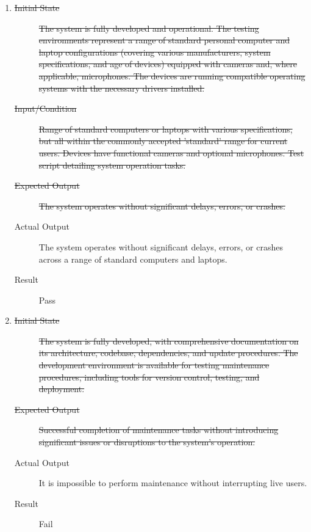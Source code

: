 \documentclass[12pt, titlepage]{article}
\begin{document}
\begin{enumerate}[NFR-T1]
  \item \label{NFRT18}
    \begin{description}
    \item[\sout{Initial State}]\sout{ The system is fully developed and operational. The testing
      environments represent a range of standard personal computer and laptop
      configurations (covering various manufacturers, system specifications, and
      age of devices) equipped with cameras and, where applicable, microphones.
      The devices are running compatible operating systems with the necessary
      drivers installed.
    }\item[\sout{Input/Condition}]\sout{ Range of standard computers or laptops with various
      specifications, but all within the commonly accepted 'standard' range for
      current users. Devices have functional cameras and optional microphones.
      Test script detailing system operation tasks.
    }\item[\sout{Expected Output}]\sout{ The system operates without significant delays, errors,
      or crashes.
    }\item[Actual Output] The system operates without significant delays, errors, or
      crashes across a range of standard computers and laptops.
    \item[Result] Pass
    \end{description}
  \item \label{NFRT19}
    \begin{description}
    \item[\sout{Initial State}]\sout{ The system is fully developed, with comprehensive
      documentation on its architecture, codebase, dependencies, and update
      procedures. The development environment is available for testing
      maintenance procedures, including tools for version control, testing, and
      deployment.
    }\item[\sout{Expected Output}]\sout{ Successful completion of maintenance tasks without
      introducing significant issues or disruptions to the system's operation.
    }\item[Actual Output] It is impossible to perform maintenance without
      interrupting live users.
    \item[Result] Fail

\end{description}
\end{enumerate}
\end{document}
